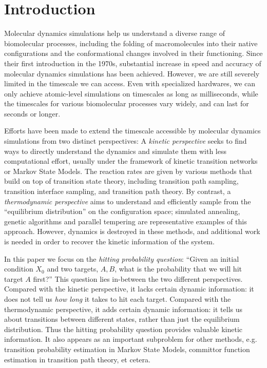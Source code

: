 \documentclass[english, aip, jcp, priprint, graphicx,floatfix]{revtex4-1}
\theoremstyle{plain}
\theoremstyle{definition}
\theoremstyle{plain}
\begin{document}
\section{Introduction}

Molecular dynamics simulations help us understand a diverse range of biomolecular processes, including the folding of macromolecules into their native configurations\cite{Scheraga2007-qw} and the conformational changes involved in their functioning.\cite{Hospital2015-ol} Since their first introduction in the 1970s,\cite{McCammon1977-kg, Warshel1976-qg} substantial increase in speed and accuracy of molecular dynamics simulations has been achieved. However, we are still severely limited in the timescale we can access. Even with specialized hardwares, we can only achieve atomic-level simulations on timescales as long as milliseconds,\cite{Dror2012-ws} while the timescales for various biomolecular processes vary widely, and can last for seconds or longer.\cite{Naganathan2005-ki, Zemora2010-lb} 

Efforts have been made to extend the timescale accessible by molecular dynamics simulations from two distinct perspectives: A \emph{kinetic perspective} seeks to find ways to directly understand the dynamics and simulate them with less computational effort, usually under the framework of kinetic transition networks\cite{Noe2006-cs, Wales2006-ur} or Markov State Models\cite{Pande2010-yi, Chodera2014-bh, Husic2018-xp}. The reaction rates are given by various methods that build on top of transition state theory\cite{Eyring1935-ur, Chandler1978-bq, Wigner1997-kk}, including transition path sampling\cite{Dellago1998-lb, Bolhuis2002-ws}, transition interface sampling\cite{Van_Erp2005-vw}, and transition path theory\cite{E2006-fm, E2010-sr}. By contrast, a \emph{thermodynamic perspective} aims to understand and efficiently sample from the ``equilibrium distribution'' on the configuration space; simulated annealing,\cite{Kirkpatrick1983-su} genetic algorithms\cite{Goldberg1989-ko} and parallel tempering\cite{Sugita1999-vh} are representative examples of this approach. However, dynamics is destroyed in these methods, and additional work\cite{Yang2007-gn, Andrec2005-fh, Zheng2009-ow, Huang2010-uu} is needed in order to recover the kinetic information of the system.

In this paper we focus on the \emph{hitting probability question}: ``Given an initial condition $X_0$ and two targets, $A,B$, what is the probability that we will hit target $A$ first?'' This question lies in-between the two different perspectives. Compared with the kinetic perspective, it lacks certain dynamic information: it does not tell us \emph{how long} it takes to hit each target.  Compared with the thermodynamic perspective, it adds certain dynamic information: it tells us about transitions between different states, rather than just the equilibrium distribution. Thus the hitting probability question provides valuable kinetic information.  It also appears as an important subproblem for other methods, e.g. transition probability estimation in Markov State Models, committor function estimation in transition path theory, et cetera.
\end{document}

